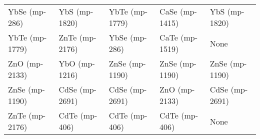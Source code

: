 \begin{longtable}{lllll}
    YbSe (mp-286) &     YbS (mp-1820) &    YbTe (mp-1779) &    CaSe (mp-1415) &     YbS (mp-1820) \\
   YbTe (mp-1779) &    ZnTe (mp-2176) &     YbSe (mp-286) &    CaTe (mp-1519) &              None \\
    ZnO (mp-2133) &     YbO (mp-1216) &    ZnSe (mp-1190) &    ZnSe (mp-1190) &    ZnSe (mp-1190) \\
   ZnSe (mp-1190) &    CdSe (mp-2691) &    CdSe (mp-2691) &     ZnO (mp-2133) &    CdSe (mp-2691) \\
   ZnTe (mp-2176) &     CdTe (mp-406) &     CdTe (mp-406) &     CdTe (mp-406) &              None \\
\end{longtable}
